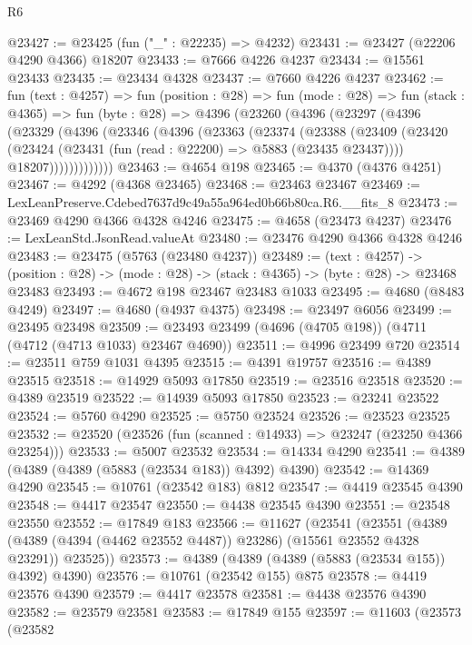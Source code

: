 \begin{lexlean}{R6}
\begin{coremodule}
@23427 := @23425 (fun ("_" : @22235) => @4232)
@23431 := @23427 (@22206 @4290 @4366) @18207
@23433 := @7666 @4226 @4237
@23434 := @15561 @23433
@23435 := @23434 @4328
@23437 := @7660 @4226 @4237
@23462 := fun (text : @4257) =>
  fun (position : @28) =>
  fun (mode : @28) =>
  fun (stack : @4365) =>
  fun (byte : @28) =>
  @4396
    (@23260
      (@4396
        (@23297
          (@4396
            (@23329
              (@4396
                (@23346
                  (@4396
                    (@23363
                      (@23374
                        (@23388
                          (@23409
                            (@23420
                              (@23424 (@23431 (fun (read : @22200) => @5883 (@23435 @23437))))
                              @18207)))))))))))))
@23463 := @4654 @198
@23465 := @4370 (@4376 @4251)
@23467 := @4292 (@4368 @23465)
@23468 := @23463 @23467
@23469 := LexLeanPreserve.Cdebed7637d9c49a55a964ed0b66b80ca.R6.__fits_8
@23473 := @23469 @4290 @4366 @4328 @4246
@23475 := @4658 (@23473 @4237)
@23476 := LexLeanStd.JsonRead.valueAt
@23480 := @23476 @4290 @4366 @4328 @4246
@23483 := @23475 (@5763 (@23480 @4237))
@23489 := (text : @4257) ->
  (position : @28) -> (mode : @28) -> (stack : @4365) -> (byte : @28) -> @23468 @23483
@23493 := @4672 @198 @23467 @23483 @1033
@23495 := @4680 (@8483 @4249)
@23497 := @4680 (@4937 @4375)
@23498 := @23497 @6056
@23499 := @23495 @23498
@23509 := @23493 @23499 (@4696 (@4705 @198)) (@4711 (@4712 (@4713 @1033) @23467 @4690))
@23511 := @4996 @23499 @720
@23514 := @23511 @759 @1031 @4395
@23515 := @4391 @19757
@23516 := @4389 @23515
@23518 := @14929 @5093 @17850
@23519 := @23516 @23518
@23520 := @4389 @23519
@23522 := @14939 @5093 @17850
@23523 := @23241 @23522
@23524 := @5760 @4290
@23525 := @5750 @23524
@23526 := @23523 @23525
@23532 := @23520 (@23526 (fun (scanned : @14933) => @23247 (@23250 @4366 @23254)))
@23533 := @5007 @23532
@23534 := @14334 @4290
@23541 := @4389 (@4389 (@4389 (@5883 (@23534 @183)) @4392) @4390)
@23542 := @14369 @4290
@23545 := @10761 (@23542 @183) @812
@23547 := @4419 @23545 @4390
@23548 := @4417 @23547
@23550 := @4438 @23545 @4390
@23551 := @23548 @23550
@23552 := @17849 @183
@23566 := @11627
    (@23541
      (@23551
        (@4389 (@4389 (@4394 (@4462 @23552 @4487)) @23286) (@15561 @23552 @4328 @23291))
        @23525))
@23573 := @4389 (@4389 (@4389 (@5883 (@23534 @155)) @4392) @4390)
@23576 := @10761 (@23542 @155) @875
@23578 := @4419 @23576 @4390
@23579 := @4417 @23578
@23581 := @4438 @23576 @4390
@23582 := @23579 @23581
@23583 := @17849 @155
@23597 := @11603
    (@23573
      (@23582

\end{coremodule}
\end{lexlean}
